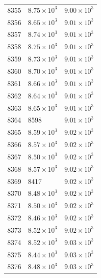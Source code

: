\begin{table}[H]
\begin{tabular}{lll}
8355 & $\displaystyle 8.75 \times 10^{3}$ & $\displaystyle 9.00 \times 10^{3}$ \\
8356 & $\displaystyle 8.65 \times 10^{3}$ & $\displaystyle 9.01 \times 10^{3}$ \\
8357 & $\displaystyle 8.74 \times 10^{3}$ & $\displaystyle 9.01 \times 10^{3}$ \\
8358 & $\displaystyle 8.75 \times 10^{3}$ & $\displaystyle 9.01 \times 10^{3}$ \\
8359 & $\displaystyle 8.73 \times 10^{3}$ & $\displaystyle 9.01 \times 10^{3}$ \\
8360 & $\displaystyle 8.70 \times 10^{3}$ & $\displaystyle 9.01 \times 10^{3}$ \\
8361 & $\displaystyle 8.66 \times 10^{3}$ & $\displaystyle 9.01 \times 10^{3}$ \\
8362 & $\displaystyle 8.64 \times 10^{3}$ & $\displaystyle 9.01 \times 10^{3}$ \\
8363 & $\displaystyle 8.65 \times 10^{3}$ & $\displaystyle 9.01 \times 10^{3}$ \\
8364 & 8598 & $\displaystyle 9.01 \times 10^{3}$ \\
8365 & $\displaystyle 8.59 \times 10^{3}$ & $\displaystyle 9.02 \times 10^{3}$ \\
8366 & $\displaystyle 8.57 \times 10^{3}$ & $\displaystyle 9.02 \times 10^{3}$ \\
8367 & $\displaystyle 8.50 \times 10^{3}$ & $\displaystyle 9.02 \times 10^{3}$ \\
8368 & $\displaystyle 8.57 \times 10^{3}$ & $\displaystyle 9.02 \times 10^{3}$ \\
8369 & 8417 & $\displaystyle 9.02 \times 10^{3}$ \\
8370 & $\displaystyle 8.48 \times 10^{3}$ & $\displaystyle 9.02 \times 10^{3}$ \\
8371 & $\displaystyle 8.50 \times 10^{3}$ & $\displaystyle 9.02 \times 10^{3}$ \\
8372 & $\displaystyle 8.46 \times 10^{3}$ & $\displaystyle 9.02 \times 10^{3}$ \\
8373 & $\displaystyle 8.52 \times 10^{3}$ & $\displaystyle 9.02 \times 10^{3}$ \\
8374 & $\displaystyle 8.52 \times 10^{3}$ & $\displaystyle 9.03 \times 10^{3}$ \\
8375 & $\displaystyle 8.44 \times 10^{3}$ & $\displaystyle 9.03 \times 10^{3}$ \\
8376 & $\displaystyle 8.48 \times 10^{3}$ & $\displaystyle 9.03 \times 10^{3}$ \\

\end{tabular}
\end{table}
